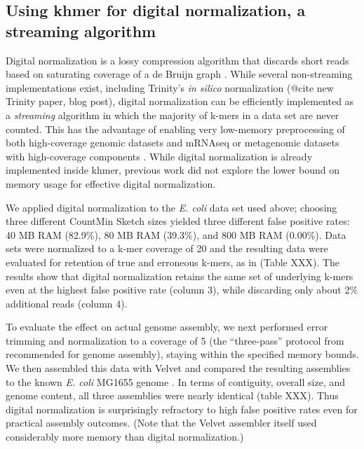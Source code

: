 \documentclass{article}
\begin{document}
\subsection{Using khmer for digital normalization, a streaming algorithm}

Digital normalization is a lossy compression algorithm that discards
short reads based on saturating coverage of a de Bruijn graph
\cite{Brown2012}.  While several non-streaming implementations exist, including
Trinity's {\em in silico} normalization (@cite new Trinity paper, blog
post), digital normalization can be efficiently implemented as a {\em
  streaming} algorithm in which the majority of k-mers in a data set
are never counted.  This has the advantage of enabling very low-memory
preprocessing of both high-coverage genomic datasets and mRNAseq or
metagenomic datasets with high-coverage components \cite{Brown2012,
  @Adina}.  While digital normalization is already
implemented inside khmer, previous work did not explore the lower bound
on memory usage for effective digital normalization.

We applied digital normalization to the {\em E. coli} data set used
above; choosing three different CountMin Sketch sizes yielded three different false
positive rates: 40 MB RAM (82.9\%), 80 MB RAM (39.3\%), and 800 MB RAM
(0.00\%).  Data sets were normalized to a k-mer coverage of 20 and the
resulting data were evaluated for retention of true and erroneous
k-mers, as in \cite{Brown2012} (Table XXX).  The results show that
digital normalization retains the same set of underlying
k-mers even at the highest false positive rate (column 3), while discarding only
about 2\% additional reads (column 4).

To evaluate the effect on actual genome assembly, we next performed
error trimming and normalization to a coverage of 5 (the
``three-pass'' protocol from \cite{Brown2012} recommended for
genome assembly), staying within the specified memory bounds.  We then
assembled this data with Velvet and compared the resulting assemblies to the known
{\em E. coli} MG1655 genome \cite{Zerbino2008}.  In terms of contiguity, overall size,
and genome content, all three assemblies were nearly identical (table
XXX).  Thus digital normalization is surprisingly refractory to high
false positive rates even for practical assembly outcomes.  (Note that
the Velvet assembler itself used considerably more memory than digital
normalization.)
\end{document}
